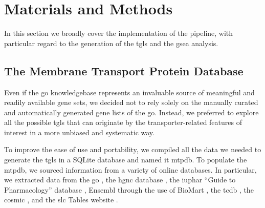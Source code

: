 \section{Materials and Methods}

In this section we broadly cover the implementation of the pipeline, with
particular regard to the generation of the \glspl{tgl} and the \gls{gsea}
analysis.



\subsection{The Membrane Transport Protein Database}

Even if the \gls{go} knowledgebase \cite{ashburnerGeneOntologyTool2000,
thegeneontologyconsortiumGeneOntologyKnowledgebase2023} represents an invaluable
source of meaningful and readily available gene sets, we decided not to rely solely on the manually curated and
automatically generated gene lists of the \gls{go}. Instead, we preferred to
explore all the possible \glspl{tgl} that can originate by the
transporter-related features of interest in a more unbiased and systematic way.

To improve the ease of use and portability, we compiled all the data we needed
to generate the \glspl{tgl} in a SQLite database and named it \gls{mtpdb}. To
populate the \gls{mtpdb}, we sourced information from a variety of online
databases. In particular, we extracted data from the \gls{go}
\cite{ashburnerGeneOntologyTool2000,
thegeneontologyconsortiumGeneOntologyKnowledgebase2023}, the \gls{hgnc} database
\cite{sealGenenamesOrgHGNC2023}, the \gls{iuphar} ``Guide to Pharmacology''
database \cite{hardingIUPHARBPSGuide2022}, Ensembl
\cite{cunninghamEnsembl20222022} through the use of BioMart
\cite{smedleyBioMartBiologicalQueries2009}, the \gls{tcdb}
\cite{saierTransporterClassificationDatabase2021}, the \gls{cosmic}
\cite{tateCOSMICCatalogueSomatic2019}, and the \gls{slc} Tables website
\cite{hedigerABCsMembraneTransporters2013}.


